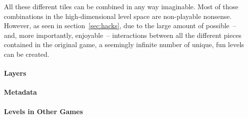 All these different tiles can be combined in any way imaginable. Most
of those combinations in the high-dimensional level space are
non-playable nonsense. However, as seen in section~\ref{sec:hacks},
due to the large amount of possible~-- and, more importantly,
enjoyable~-- interactions between all the different pieces contained
in the original game, a seemingly infinite number of unique, fun
levels can be created.


\paragraph{Layers}
\label{par:layers}


\paragraph{Metadata}

\paragraph{Levels in Other Games}



